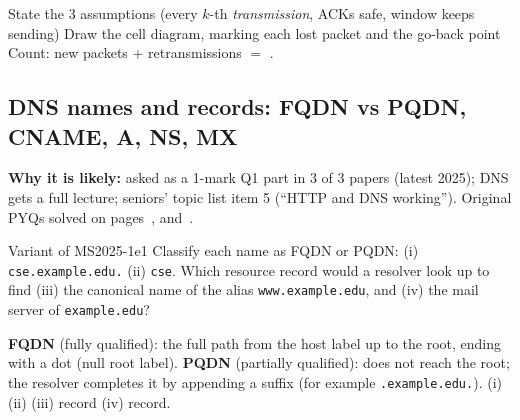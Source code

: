 \begin{answerplan}[2 marks]
 State the 3 assumptions (every $k$-th \emph{transmission}, ACKs safe, window keeps sending) \quad
{} Draw the cell diagram, marking each lost packet and the go-back point \quad
{} Count: new packets + retransmissions $=$ .
\end{answerplan}

\subsection{DNS names and records: FQDN vs PQDN, CNAME, A, NS, MX}\label{iq:C17}
    

\textbf{Why it is likely:} asked as a 1-mark Q1 part in 3 of 3 papers (latest 2025); DNS gets a full lecture; seniors' topic list item 5 (``HTTP and DNS working''). Original PYQs solved on pages~\pageref{q:MS2025-1e}, \pageref{q:MS2024-1a} and~\pageref{q:MS2022-1d}.

\begin{question}{Variant of MS2025-1e}{1}
Classify each name as FQDN or PQDN: (i) \texttt{cse.example.edu.} \quad (ii) \texttt{cse}. Which resource record would a resolver look up to find (iii) the canonical name of the alias \texttt{www.example.edu}, and (iv) the mail server of \texttt{example.edu}?
\end{question}
\begin{solution}
\textbf{FQDN} (fully qualified): the full path from the host label up to the root, ending with a dot (null root label). \textbf{PQDN} (partially qualified): does not reach the root; the resolver completes it by appending a suffix (for example \texttt{.example.edu.}).
(i)  \quad (ii)  \quad (iii)  record \quad (iv)  record.
\end{solution}

